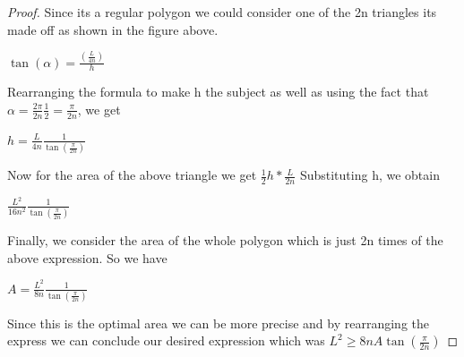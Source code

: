 \documentclass[a4paper]{book}
\begin{document}
\begin{proof}
    	Since its a regular polygon we could consider one of the 2n triangles its made off as shown in the figure above. 
	\begin{center}
		$\displaystyle \tan(\alpha)=\frac{(\frac{L}{4n})}{h}$
	\end{center}
    	Rearranging the formula to make h the subject as well as using the fact that $\alpha=\frac{2\pi}{2n} \frac{1}{2}=\frac{\pi}{2n}$, we get 
	\begin{center}
		$\displaystyle h=\frac{L}{4n} \frac{1}{\tan(\frac{\pi}{2n})}$
	\end{center}
	Now for the area of the above triangle we get $\frac{1}{2}h*\frac{L}{2n}$
    	Substituting h, we obtain
	\begin{center}
		$\displaystyle \frac{L^{2}}{16n^{2}} \frac{1}{\tan(\frac{\pi}{2n})}$
	\end{center}
    	Finally, we consider the area of the whole polygon which is just 2n times of the above expression. So we have 
	\begin{center}
    		$\displaystyle A=\frac{L^{2}}{8n} \frac{1}{\tan(\frac{\pi}{2n})}$
	\end{center}
    	Since this is the optimal area we can be more precise and by rearranging the express we can conclude our desired expression which was $L^{2} \ge 8nA\tan(\frac{\pi}{2n})$
\end{proof}
\end{document}
